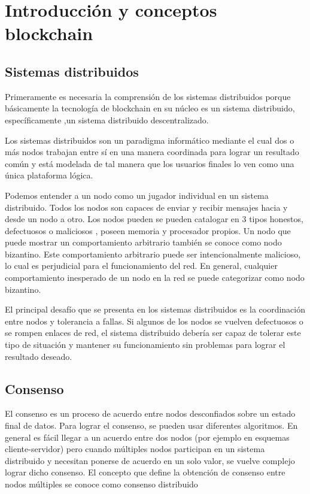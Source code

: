 
\section {Introducción y conceptos blockchain}  %

 
\subsection {Sistemas distribuidos}

Primeramente es necesaria la  comprensión de los sistemas distribuidos porque básicamente la tecnología de blockchain  en su núcleo es un sistema distribuido, específicamente ,un sistema distribuido descentralizado.

Los sistemas distribuidos son un paradigma informático mediante el cual dos o más nodos trabajan entre sí en una manera coordinada para lograr un resultado común y está modelada de tal manera que los usuarios finales lo ven como una única plataforma lógica.\cite{bashir2017mastering}

Podemos entender a un nodo como un jugador individual en un sistema distribuido. Todos los nodos son capaces de enviar y recibir mensajes hacia y desde un nodo a otro. Los nodos pueden se pueden catalogar en 3 tipos honestos, defectuosos o maliciosos , poseen  memoria y procesador propios. Un nodo que puede mostrar un comportamiento arbitrario también se conoce como nodo bizantino. Este comportamiento arbitrario puede ser intencionalmente malicioso, lo cual es perjudicial para el funcionamiento del red. En general, cualquier comportamiento inesperado de un nodo en la red se puede categorizar como nodo bizantino.

El principal desafío que se presenta en los sistemas distribuidos es la coordinación entre nodos y tolerancia a fallas. Si algunos de los nodos se vuelven defectuosos o se rompen enlaces de red, el sistema distribuido debería ser capaz de  tolerar este tipo de situación y mantener su funcionamiento sin problemas para lograr el resultado deseado.


\subsection{Consenso}
El consenso es un proceso de acuerdo entre nodos desconfiados sobre un estado final de datos. Para lograr el consenso, se pueden usar diferentes algoritmos. En general es fácil llegar a un acuerdo entre dos nodos (por ejemplo en esquemas cliente-servidor) pero cuando múltiples nodos participan en un sistema distribuido y necesitan ponerse de acuerdo en un solo valor, se vuelve complejo lograr dicho consenso. El concepto que define la obtención de consenso entre nodos múltiples se conoce como consenso distribuido\cite{bashir2017mastering}

